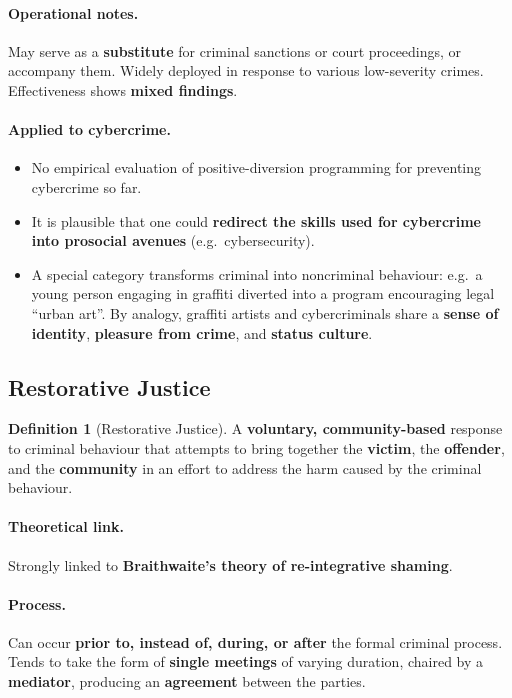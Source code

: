 \documentclass[11pt,a4paper,openany]{report}
\theoremstyle{definition}
\newtheorem{definition}{Definition}[chapter]
\theoremstyle{plain}
\theoremstyle{remark}
\begin{document}
\paragraph{Operational notes.} May serve as a \textbf{substitute} for criminal sanctions or court proceedings, or accompany them. Widely deployed in response to various low-severity crimes. Effectiveness shows \textbf{mixed findings}.

\paragraph{Applied to cybercrime.}
\begin{itemize}
    \item No empirical evaluation of positive-diversion programming for preventing cybercrime so far.
    \item It is plausible that one could \textbf{redirect the skills used for cybercrime into prosocial avenues} (e.g.\ cybersecurity).
    \item A special category transforms criminal into noncriminal behaviour: e.g.\ a young person engaging in graffiti diverted into a program encouraging legal ``urban art''. By analogy, graffiti artists and cybercriminals share a \textbf{sense of identity}, \textbf{pleasure from crime}, and \textbf{status culture}.
\end{itemize}

\subsection{Restorative Justice}

\begin{definition}[Restorative Justice]
A \textbf{voluntary, community-based} response to criminal behaviour that attempts to bring together the \textbf{victim}, the \textbf{offender}, and the \textbf{community} in an effort to address the harm caused by the criminal behaviour.
\end{definition}

\paragraph{Theoretical link.} Strongly linked to \textbf{Braithwaite's theory of re-integrative shaming}.

\paragraph{Process.} Can occur \textbf{prior to, instead of, during, or after} the formal criminal process. Tends to take the form of \textbf{single meetings} of varying duration, chaired by a \textbf{mediator}, producing an \textbf{agreement} between the parties.
\end{document}
